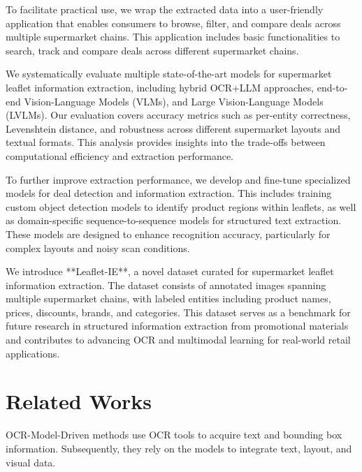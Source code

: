 \documentclass[11pt]{article}
\begin{document}
 To facilitate practical use, we wrap the extracted data into a user-friendly application that enables consumers to browse, filter, and compare deals across multiple supermarket chains. This application includes basic functionalities to search, track and compare deals across different supermarket chains.

 We systematically evaluate multiple state-of-the-art models for supermarket leaflet information extraction, including hybrid OCR+LLM approaches, end-to-end Vision-Language Models (VLMs), and Large Vision-Language Models (LVLMs). Our evaluation covers accuracy metrics such as per-entity correctness, Levenshtein distance, and robustness across different supermarket layouts and textual formats. This analysis provides insights into the trade-offs between computational efficiency and extraction performance.

 To further improve extraction performance, we develop and fine-tune specialized models for deal detection and information extraction. This includes training custom object detection models to identify product regions within leaflets, as well as domain-specific sequence-to-sequence models for structured text extraction. These models are designed to enhance recognition accuracy, particularly for complex layouts and noisy scan conditions.

 We introduce **Leaflet-IE**, a novel dataset curated for supermarket leaflet information extraction. The dataset consists of annotated images spanning multiple supermarket chains, with labeled entities including product names, prices, discounts, brands, and categories. This dataset serves as a benchmark for future research in structured information extraction from promotional materials and contributes to advancing OCR and multimodal learning for real-world retail applications.
    


\section{Related Works}
OCR-Model-Driven methods use OCR tools to acquire text
and bounding box information. Subsequently, they rely
on the models to integrate text, layout, and visual data.
\end{document}
